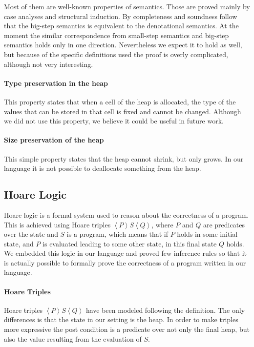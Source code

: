 \documentclass[12pt, a4paper, oneside]{article}
\begin{document}
Most of them are well-known properties of semantics. Those are proved mainly by case analyses and structural induction. By completeness and soundness follow that the big-step semantics is equivalent to the denotational semantics. At the moment the similar correspondence from small-step semantics and big-step semantics holds only in one direction. Nevertheless we expect it to hold as well, but because of the specific definitions used the proof is overly complicated, although not very interesting.

\paragraph{Type preservation in the heap}
This property states that when a cell of the heap is allocated, the type of the values that can be stored in that cell is fixed and cannot be changed. Although we did not use this property, we believe it could be useful in future work.

\paragraph{Size preservation of the heap}
This simple property states that the heap cannot shrink, but only grows.
In our language it is not possible to deallocate something from the heap.

\subsection{Hoare Logic}
\label{sec:hoare}
Hoare logic is a formal system used to reason about the correctness of a program. 
This is achieved using Hoare triples $\left\langle P \right\rangle   S \left\langle Q \right\rangle$, where $P$ and $Q$ are predicates over the state and $S$ is a program, which means that if $P$ holds in some initial state, and $P$ is evaluated leading to some other state, in this final state $Q$ holds.
We embedded this logic in our language and proved few inference rules so that it is actually possible to formally prove the correctness of a program written in our language.

\paragraph{Hoare Triples}
Hoare triples $ \left\langle P \right\rangle   S \left\langle Q \right\rangle$ have been modeled following the definition. The only differences is that the state in our  setting is the heap. In order to make triples more expressive the post condition is a predicate over not only the final heap, but also the value resulting from the evaluation of $S$.
\end{document}
